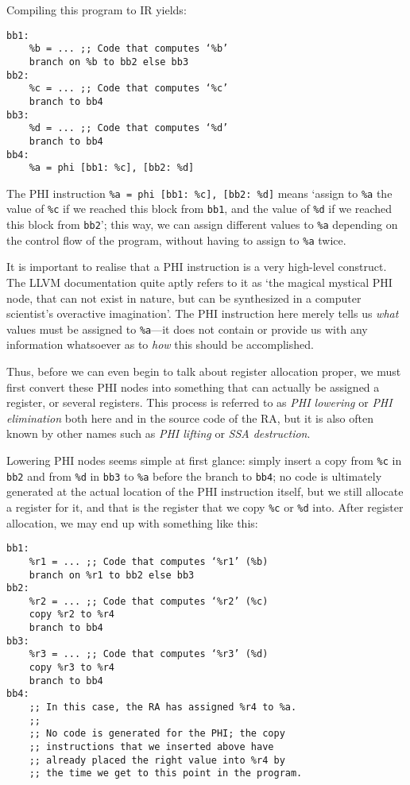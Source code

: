 \documentclass[12pt]{report}
\begin{document}
\noindent Compiling this program to IR yields:
\begin{Verbatim}
bb1:
    %b = ... ;; Code that computes ‘%b’
    branch on %b to bb2 else bb3
bb2:
    %c = ... ;; Code that computes ‘%c’
    branch to bb4
bb3:
    %d = ... ;; Code that computes ‘%d’
    branch to bb4
bb4:
    %a = phi [bb1: %c], [bb2: %d]
\end{Verbatim}

\noindent The PHI instruction \verb|%a = phi [bb1: %c], [bb2: %d]| means ‘assign to \verb|%a| the value of \verb|%c| if we reached this block
from \verb|bb1|, and the value of \verb|%d| if we reached this block from \verb|bb2|’; this way, we can assign different values to \verb|%a|
depending on the control flow of the program, without having to assign to \verb|%a| twice.

It is important to realise that a PHI instruction is a very high-level construct. The LLVM documentation quite aptly refers to it as ‘the 
magical mystical PHI node, that can not exist in nature, but can be synthesized in a computer scientist's overactive imagination’. The PHI 
instruction here merely tells us \textit{what} values must be assigned to \verb|%a|—it does not contain or provide us with any information
whatsoever as to \textit{how} this should be accomplished.

Thus, before we can even begin to talk about register allocation proper, we must first convert these PHI nodes into something that can
actually be assigned a register, or several registers. This process is referred to as \textit{PHI lowering} or \textit{PHI elimination}
both here and in the source code of the RA, but it is also often known by other names such as \textit{PHI lifting} or \textit{SSA 
destruction}.

Lowering PHI nodes seems simple at first glance: simply insert a copy from \verb|%c| in \verb|bb2| and from \verb|%d| in \verb|bb3| to 
\verb|%a| before the branch to \verb|bb4|; no code is ultimately generated at the actual location of the PHI instruction itself, but we
still allocate a register for it, and that is the register that we copy \verb|%c| or \verb|%d| into. After register allocation, we may 
end up with something like this:
\begin{Verbatim}
bb1:
    %r1 = ... ;; Code that computes ‘%r1’ (%b)
    branch on %r1 to bb2 else bb3
bb2:
    %r2 = ... ;; Code that computes ‘%r2’ (%c)
    copy %r2 to %r4
    branch to bb4
bb3:
    %r3 = ... ;; Code that computes ‘%r3’ (%d)
    copy %r3 to %r4
    branch to bb4
bb4:
    ;; In this case, the RA has assigned %r4 to %a.
    ;;
    ;; No code is generated for the PHI; the copy
    ;; instructions that we inserted above have
    ;; already placed the right value into %r4 by
    ;; the time we get to this point in the program.
\end{Verbatim}
\end{document}
